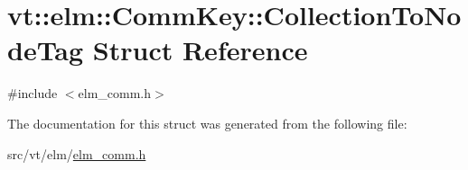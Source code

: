 \hypertarget{structvt_1_1elm_1_1_comm_key_1_1_collection_to_node_tag}{}\section{vt\+:\+:elm\+:\+:Comm\+Key\+:\+:Collection\+To\+Node\+Tag Struct Reference}
\label{structvt_1_1elm_1_1_comm_key_1_1_collection_to_node_tag}


{\ttfamily \#include $<$elm\+\_\+comm.\+h$>$}



The documentation for this struct was generated from the following file\+:\begin{DoxyCompactItemize}
\item 
src/vt/elm/\hyperlink{elm__comm_8h}{elm\+\_\+comm.\+h}\end{DoxyCompactItemize}
